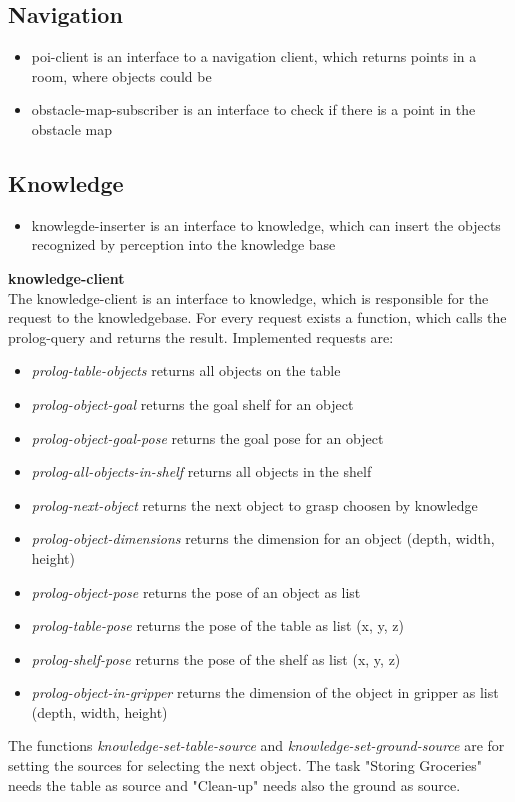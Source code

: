 \documentclass[main.tex]{subfiles}
\begin{document}
                \subsection{Navigation}
	                 \begin{itemize}
		 				 \item poi-client is an interface to a navigation client, which returns points in a room, where objects could be 
		  				 \item obstacle-map-subscriber is an interface to check if there is a point in the obstacle map
					\end{itemize}  
                \subsection{Knowledge}
	                \begin{itemize}
	 				      \item knowlegde-inserter is an interface to knowledge, which can insert the objects recognized by perception into the knowledge base
				    \end{itemize}
				          \textbf{knowledge-client} \\
				          The knowledge-client is an interface to knowledge, which is responsible for the request to the knowledgebase. For every request exists a function, which calls the prolog-query and returns the result. Implemented requests are:
				    \begin{itemize}
				             \item \textit{prolog-table-objects} returns all objects on the table
				             \item \textit{prolog-object-goal} returns the goal shelf for an object
				             \item \textit{prolog-object-goal-pose} returns the goal pose for an object
				             \item \textit{prolog-all-objects-in-shelf} returns all objects in the shelf
				             \item \textit{prolog-next-object} returns the next object to grasp choosen by knowledge
				             \item \textit{prolog-object-dimensions} returns the dimension for an object (depth, width, height)
				             \item \textit{prolog-object-pose} returns the pose of an object as list
				             \item \textit{prolog-table-pose} returns the pose of the table as list (x, y, z)
				             \item \textit{prolog-shelf-pose} returns the pose of the shelf as list (x, y, z)
				             \item \textit{prolog-object-in-gripper} returns the dimension of the object in gripper as list (depth, width, height)
				    \end{itemize} 
				    The functions \textit{knowledge-set-table-source} and \textit{knowledge-set-ground-source} are for setting the sources for selecting the next object. The task "Storing Groceries" needs the table as source and "Clean-up" needs also the ground as source. 
\end{document}
